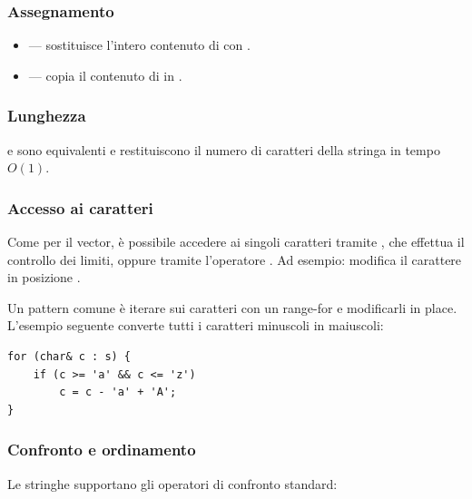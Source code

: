 \subsubsection{Assegnamento}

\begin{itemize}
    \item {} --- sostituisce l'intero contenuto di  con .
    \item {} --- copia il contenuto di  in .
\end{itemize}

\subsubsection{Lunghezza}

 e  sono equivalenti e restituiscono
il numero di caratteri della stringa in tempo $O(1)$.

\subsubsection{Accesso ai caratteri}

Come per il vector, \`e possibile accedere ai singoli caratteri tramite
, che effettua il controllo dei limiti, oppure
tramite l'operatore . Ad esempio:
 modifica il carattere in posizione .

Un pattern comune \`e iterare sui caratteri con un range-for e modificarli
in place. L'esempio seguente converte tutti i caratteri minuscoli in maiuscoli:

\begin{codeexample}
    \begin{codebox}
        \begin{lstlisting}
for (char& c : s) {
    if (c >= 'a' && c <= 'z')
        c = c - 'a' + 'A';
}
        \end{lstlisting}
    \end{codebox}
\end{codeexample}

\subsubsection{Confronto e ordinamento}

Le stringhe supportano gli operatori di confronto standard:

